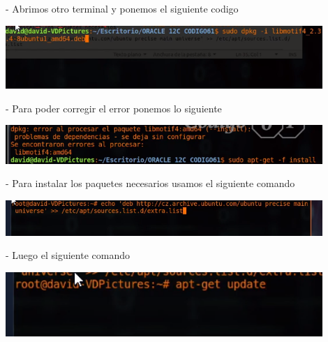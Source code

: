 \documentclass[12pt,letterpaper]{article}
\begin{document}
\begin{itemize}
- Abrimos otro terminal y ponemos el siguiente codigo\\
\end{itemize}

\begin{center}
	\includegraphics[width=12cm]{./Imagenes/27} 
\end{center}


\begin{itemize}
- Para poder corregir el error ponemos lo siguiente\\
\end{itemize}

\begin{center}
	\includegraphics[width=12cm]{./Imagenes/28} 
\end{center}


\begin{itemize}
- Para instalar los paquetes necesarios usamos el siguiente comando\\
\end{itemize}

\begin{center}
	\includegraphics[width=12cm]{./Imagenes/29} 
\end{center}


\begin{itemize}
- Luego el siguiente comando\\
\end{itemize}

\begin{center}
	\includegraphics[width=12cm]{./Imagenes/30} 
\end{center}
\end{document}
